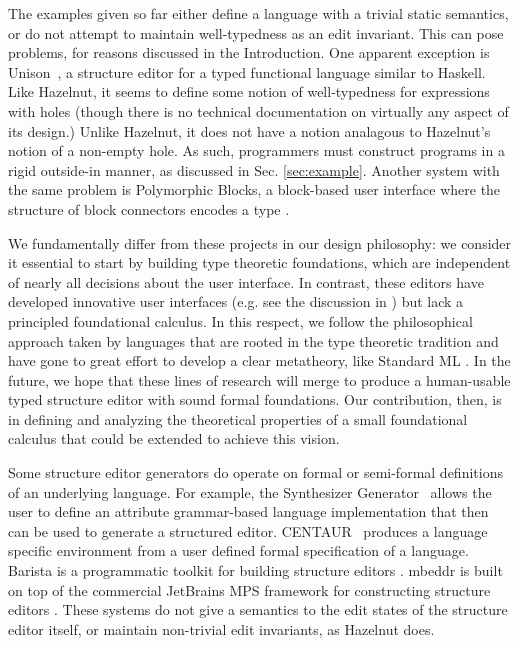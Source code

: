 \documentclass[preprint,9pt]{sigplanconf}
\begin{document}
The examples given so far either define a language with a trivial static semantics, or do not attempt to maintain well-typedness as an edit invariant. This can pose problems, for reasons discussed in the Introduction. One apparent exception is Unison~\cite{unison}, a structure editor for a typed functional language similar to Haskell. Like Hazelnut, it seems to define some notion of well-typedness for expressions with holes (though there is no technical documentation on virtually any aspect of its design.) Unlike Hazelnut, it does not have a notion analagous to Hazelnut's notion of a non-empty hole. As such, programmers must construct programs in a rigid outside-in manner, as discussed in Sec. \ref{sec:example}. Another system with the same problem is Polymorphic Blocks, a block-based user interface where the structure of block connectors encodes a type \cite{DBLP:conf/chi/LernerFG15}.

We fundamentally differ from these projects in our design philosophy: we consider it essential to start by building type theoretic foundations, which are independent of nearly all decisions about the user interface. In contrast, these editors have developed innovative user interfaces (e.g. see the discussion in \cite{DBLP:conf/sle/VolterSBK14}) but lack a principled foundational calculus. In this respect, we follow the philosophical approach taken by languages that are rooted in the type theoretic tradition and have gone to great effort to develop a clear metatheory, like Standard ML \cite{mthm97-for-dart,Harper00atype-theoretic}.  In the future, we hope that these lines of research will merge to produce a human-usable typed structure editor with sound formal foundations. Our contribution, then, is in defining and analyzing the theoretical properties of a small foundational calculus that could be extended to achieve this vision.

Some structure editor generators do operate on formal or semi-formal definitions of an underlying language. For example, the Synthesizer Generator~\cite{Reps:1984:SG:390010.808247} allows the user to define an attribute grammar-based language implementation that then can be used to generate a structured editor. CENTAUR~\cite{Borras:1988:CS:64140.65005} produces a language specific environment from a user defined formal specification of a language. Barista is a programmatic toolkit for building structure editors \cite{ko_barista:_2006}. mbeddr is built on top of the commercial JetBrains MPS framework for constructing structure editors \cite{voelter2011language,DBLP:journals/software/VoelterWK15}. These systems do not give a semantics to the edit states of the structure editor itself, or maintain non-trivial edit invariants, as Hazelnut does. 
\end{document}
